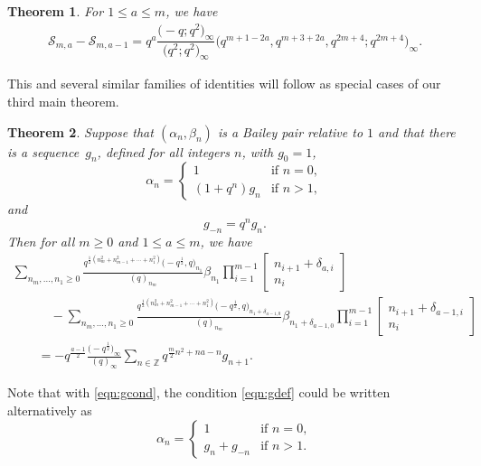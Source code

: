 \documentclass[pdftex]{sigma}
\newtheorem{Theorem}{Theorem}[section]
\numberwithin{equation}{section}
\begin{document}
\begin{Theorem}
	\label{thm:dilationex1}
	For $1\leq a\leq m$, we have
	\begin{align*}
		\mathscr{S}_{m,a}-\mathscr{S}_{m,a-1}=q^{a}\dfrac{\bigl(-q;q^2\bigr)_\infty}{\bigl(q^2;q^2\bigr)_\infty}\bigl(q^{m+1-2a},q^{m+3+2a},q^{2m+4};q^{2m+4}\bigr)_\infty.
	\end{align*}
\end{Theorem}
This and several similar families of identities will follow as special cases of our third main theorem.
\begin{Theorem} \label{thm:dilation}
	Suppose that $(\alpha_n,\beta_n)$ is a Bailey pair relative to $1$ and that there is a sequence~$g_n$, defined for all integers $n$, with $g_0 = 1$,
	\begin{equation}
		\alpha_n =
		\begin{cases}
			1 &\text{if $n= 0$}, \\
			(1+q^n)g_n &\text{if $n > 1$},
		\end{cases}
		\label{eqn:gdef}
	\end{equation}
	and
	\begin{equation} \label{eqn:gcond}
		g_{-n} = q^ng_n.
	\end{equation}
	Then for all $m \geq 0$ and $1 \leq a \leq m$, we have
	\begin{gather}
			\sum_{n_{m},\dots,n_1\geq 0}
			\frac{q^{\frac{1}{2}(n_{m}^2+n_{m-1}^2+\cdots+n_1^2)}\bigl(-q^{\frac{1}{2}},q\bigr)_{n_1}}{(q)_{n_m}}\beta_{n_1}
			\prod_{i=1}^{m-1} \begin{bmatrix} n_{i+1} + \delta_{a,i} \\ n_i \end{bmatrix} \nonumber\\
			\qquad\quad{} - \sum_{n_{m},\dots,n_1\geq 0}
			\frac{q^{\frac{1}{2}(n_{m}^2+n_{m-1}^2+\cdots+n_1^2)}\bigl(-q^{\frac{1}{2}},q\bigr)_{n_1 + \delta_{a-1,0}}}{(q)_{n_m}}\beta_{n_1 + \delta_{a-1,0}}
			\prod_{i=1}^{m-1} \begin{bmatrix} n_{i+1} + \delta_{a-1,i} \\ n_i \end{bmatrix} \nonumber\\
			\qquad{} = -q^{\frac{a-1}{2}} \frac{\bigl(-q^{\frac{1}{2}}\bigr)_{\infty}}{(q)_{\infty}} \sum_{n \in \mathbb{Z}} q^{\frac{m}{2}n^2+na-n}g_{n+1}.\label{eqn:dilationid}
	\end{gather}
\end{Theorem}	
Note that with \eqref{eqn:gcond}, the condition \eqref{eqn:gdef} could be written alternatively as
\begin{equation*}
	\alpha_n =
	\begin{cases}
		1 &\text{if $n= 0$}, \\
		g_n+g_{-n} &\text{if $n > 1$}.
	\end{cases}
\end{equation*}
\end{document}
